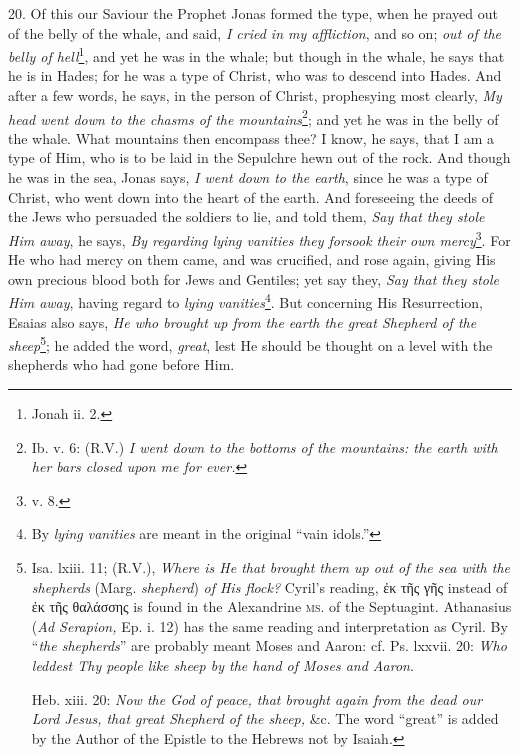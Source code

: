20. Of this our Saviour the Prophet Jonas formed the type, when he prayed out of the belly of the whale, and said, \emph{I cried in my affliction}, and so on; \emph{out of the belly of hell}\footnote{Jonah ii. 2.}, and yet he was in the whale; but though in the whale, he says that he is in Hades; for he was a type of Christ, who was to descend into Hades. And after a few words, he says, in the person of Christ, prophesying most clearly, \emph{My head went down to the chasms of the mountains}\footnote{Ib. v. 6: (R.V.) \emph{I went down to the bottoms of the mountains: the earth with her bars closed upon me for ever.}}; and yet he was in the belly of the whale. What mountains then encompass thee? I know, he says, that I am a type of Him, who is to be laid in the Sepulchre hewn out of the rock. And though he was in the sea, Jonas says, \emph{I went down to the earth}, since he was a type of Christ, who went down into the heart of the earth. And foreseeing the deeds of the Jews who persuaded the soldiers to lie, and told them, \emph{Say that they stole Him away}, he says, \emph{By regarding lying vanities they forsook their own mercy}\footnote{v. 8.}. For He who had mercy on them came, and was crucified, and rose again, giving His own precious blood both for Jews and Gentiles; yet say they, \emph{Say that they stole Him away}, having regard to \emph{lying vanities}\footnote{By \emph{lying vanities} are meant in the original “vain idols.”}. But concerning His Resurrection, Esaias also says, \emph{He who brought up from the earth the great Shepherd of the sheep}\footnote{Isa. lxiii. 11; (R.V.), \emph{Where is He that brought them up out of the sea with the shepherds} (Marg. \emph{shepherd}) \emph{of His flock?} Cyril’s reading, \textgreek{ἐκ τῆς γῆς} instead of \textgreek{ἐκ τῆς θαλάσσης} is found in the Alexandrine \textsc{ms.} of the Septuagint. Athanasius (\emph{Ad Serapion,} Ep. i. 12) has the same reading and interpretation as Cyril. By “\emph{the shepherds}” are probably meant Moses and Aaron: cf. Ps. lxxvii. 20: \emph{Who leddest Thy people like sheep by the hand of Moses and Aaron}. \par Heb. xiii. 20: \emph{Now the God of peace, that brought again from the dead our Lord Jesus, that great Shepherd of the sheep,} \&c. The word “great” is added by the Author of the Epistle to the Hebrews not by Isaiah.}; he added the word, \emph{great}, lest He should be thought on a level with the shepherds who had gone before Him.


